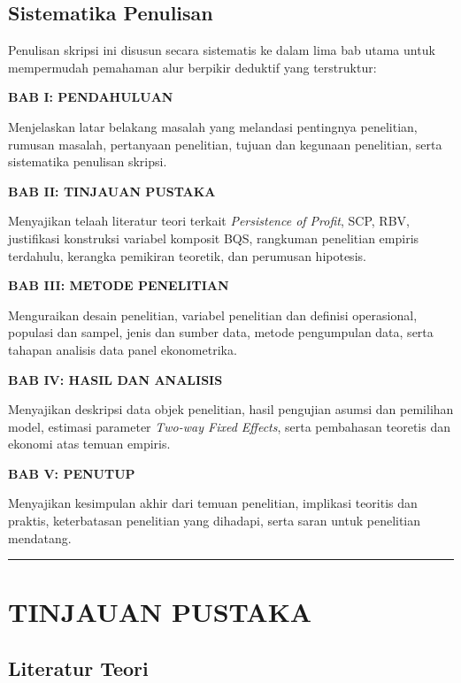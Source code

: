 \documentclass[12pt,a4paper]{article}
\begin{document}
\subsection{Sistematika Penulisan}\label{sistematika-penulisan}

Penulisan skripsi ini disusun secara sistematis ke dalam lima bab utama
untuk mempermudah pemahaman alur berpikir deduktif yang terstruktur:

\textbf{BAB I: PENDAHULUAN}

Menjelaskan latar belakang masalah yang melandasi pentingnya penelitian,
rumusan masalah, pertanyaan penelitian, tujuan dan kegunaan penelitian,
serta sistematika penulisan skripsi.

\textbf{BAB II: TINJAUAN PUSTAKA}

Menyajikan telaah literatur teori terkait \emph{Persistence of Profit},
SCP, RBV, justifikasi konstruksi variabel komposit BQS, rangkuman
penelitian empiris terdahulu, kerangka pemikiran teoretik, dan perumusan
hipotesis.

\textbf{BAB III: METODE PENELITIAN}

Menguraikan desain penelitian, variabel penelitian dan definisi
operasional, populasi dan sampel, jenis dan sumber data, metode
pengumpulan data, serta tahapan analisis data panel ekonometrika.

\textbf{BAB IV: HASIL DAN ANALISIS}

Menyajikan deskripsi data objek penelitian, hasil pengujian asumsi dan
pemilihan model, estimasi parameter \emph{Two-way Fixed Effects}, serta
pembahasan teoretis dan ekonomi atas temuan empiris.

\textbf{BAB V: PENUTUP}

Menyajikan kesimpulan akhir dari temuan penelitian, implikasi teoritis
dan praktis, keterbatasan penelitian yang dihadapi, serta saran untuk
penelitian mendatang.

\begin{center}\rule{0.5\linewidth}{0.5pt}\end{center}

\section{TINJAUAN PUSTAKA}\label{tinjauan-pustaka}

\subsection{Literatur Teori}\label{literatur-teori}
\end{document}
